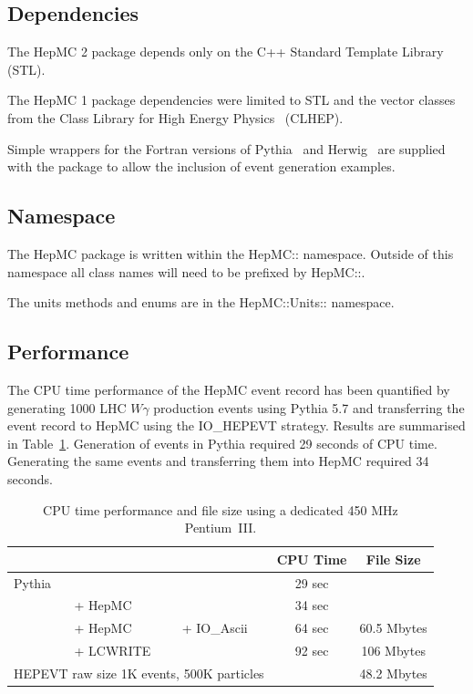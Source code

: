 \documentclass[11pt,letterpaper]{article}
\begin{document}
\subsection{Dependencies}

The HepMC 2 package  depends only on the C++ Standard
Template Library~\cite{stl} (STL).

The HepMC 1 package dependencies were limited to STL 
and the vector classes from the
Class Library for High Energy Physics~\cite{clhep} (CLHEP).  

Simple wrappers for the Fortran versions of Pythia~\cite{Sjostrand:2001yb} 
and Herwig~\cite{herwig} are supplied with the
package to allow the inclusion of event generation examples.

\subsection{Namespace}

The HepMC package is written within the HepMC:: namespace. Outside of
this namespace all class names will need to be prefixed by HepMC::.

The units methods and enums are in the HepMC::Units:: namespace.

\subsection{Performance}

The CPU time performance of the HepMC event record has been quantified
by generating 1000 LHC $W\gamma$ production events using Pythia 5.7
and transferring the event record to HepMC using the IO\_HEPEVT
strategy. Results are summarised in Table~\ref{benchmarks}.
Generation of events in Pythia required 29 seconds of CPU time.
Generating the same events and transferring them into HepMC required
34 seconds.

\begin{table}[h]
\begin{center}
\begin{tabular}{|l l l|c|c|} \hline
&&&CPU Time & File Size \\ \hline
Pythia &           &          & 29 sec & \\
       & + {\color{red}HepMC}   &          & 34 sec & \\ \hline
       & + {\color{red}HepMC} & + {\color{red}IO\_Ascii} 
       & 64 sec & 60.5 Mbytes \\
       & + {\color{green}LCWRITE} &          
       & 92 sec & 106 Mbytes \\
\multicolumn{3}{|l|}{HEPEVT raw size 1K events, 500K particles}
&& 48.2 Mbytes \\ \hline
\end{tabular}
\end{center}
\caption[Performance]{\label{benchmarks} 
  CPU time performance and file size using a dedicated 450 MHz Pentium~III.}
\end{table}
\end{document}
